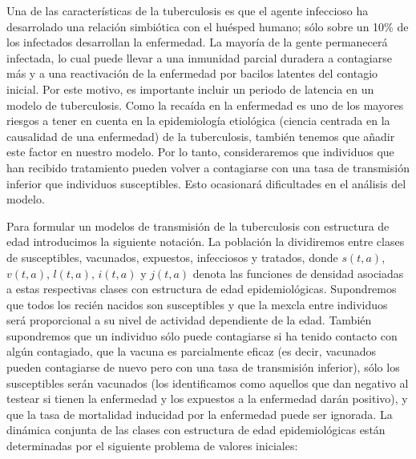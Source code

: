 \documentclass[
]{book}
\begin{document}
Una de las características de la tuberculosis es que el agente infeccioso ha desarrolado una relación simbiótica con el huésped humano; sólo sobre un 10\% de los infectados desarrollan la enfermedad. La mayoría de la gente permanecerá infectada, lo cual puede llevar a una inmunidad parcial duradera a contagiarse más y a una reactivación de la enfermedad por bacilos latentes del contagio inicial. Por este motivo, es importante incluir un periodo de latencia en un modelo de tuberculosis. Como la recaída en la enfermedad es uno de los mayores riesgos a tener en cuenta en la epidemiología etiológica (ciencia centrada en la causalidad de una enfermedad) de la tuberculosis, también tenemos que añadir este factor en nuestro modelo. Por lo tanto, consideraremos que individuos que han recibido tratamiento pueden volver a contagiarse con una tasa de transmisión inferior que individuos susceptibles. Esto ocasionará dificultades en el análisis del modelo.

Para formular un modelos de transmisión de la tuberculosis con estructura de edad introducimos la siguiente notación. La población la dividiremos entre clases de susceptibles, vacunados, expuestos, infecciosos y tratados, donde \(s(t,a)\), \(v(t,a)\), \(l(t,a)\), \(i(t,a)\) y \(j(t,a)\) denota las funciones de densidad asociadas a estas respectivas clases con estructura de edad epidemiológicas. Supondremos que todos los recién nacidos son susceptibles y que la mexcla entre individuos será proporcional a su nivel de actividad dependiente de la edad. También supondremos que un individuo sólo puede contagiarse si ha tenido contacto con algún contagiado, que la vacuna es parcialmente eficaz (es decir, vacunados pueden contagiarse de nuevo pero con una tasa de transmisión inferior), sólo los susceptibles serán vacunados (los identificamos como aquellos que dan negativo al testear si tienen la enfermedad y los expuestos a la enfermedad darán positivo), y que la tasa de mortalidad inducidad por la enfermedad puede ser ignorada. La dinámica conjunta de las clases con estructura de edad epidemiológicas están determinadas por el siguiente problema de valores iniciales:
\end{document}

